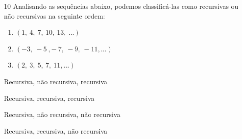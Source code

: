 
\num{10} Analisando as sequências abaixo, podemos classificá-las como
recursivas ou não recursivas na seguinte ordem:

\begin{enumerate}
\item $(1,\ 4,\ 7,\ 10,\ 13,\ \ldots)$
\item $( - 3,\  - 5\ , - \ 7,\  - 9,\  - 11, \ldots)$
\item $(2,\ 3,\ 5,\ 7,\ 11, \ldots)$
\end{enumerate}


\begin{escolha}
\item Recursiva, não recursiva, recursiva
\item Recursiva, recursiva, recursiva
\item Recursiva, não recursiva, não recursiva
\item Recursiva, recursiva, não recursiva
\end{escolha}



